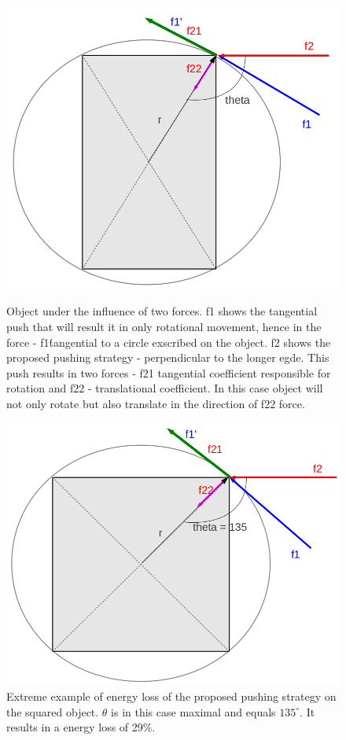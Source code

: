 \begin{figure}
\centering 

\includegraphics[width=0.5\columnwidth]{figures/rectangle-angle.png}\\


\caption{Object under the influence of two forces. f1 shows the tangential push that will result it in only rotational movement, hence in the force - f1\' tangential to a circle exscribed on the object. f2 shows the proposed pushing strategy - perpendicular to the longer egde. This push results in two forces - f21 tangential coefficient responsible for rotation and f22 - translational coefficient. In this case object will not only rotate but also translate in the direction of f22 force.  }
\label{fig:angles-rectangle}
\end{figure}


\begin{figure}
\centering
 

\includegraphics[width=0.5\columnwidth]{figures/square-angle.png}


\caption{Extreme example of energy loss of the proposed pushing strategy on the squared object. $\theta$ is in this case maximal and equals $135 ^\circ$. It results in a energy loss of 29\%.  }
\label{fig:angles-square}
\end{figure}

